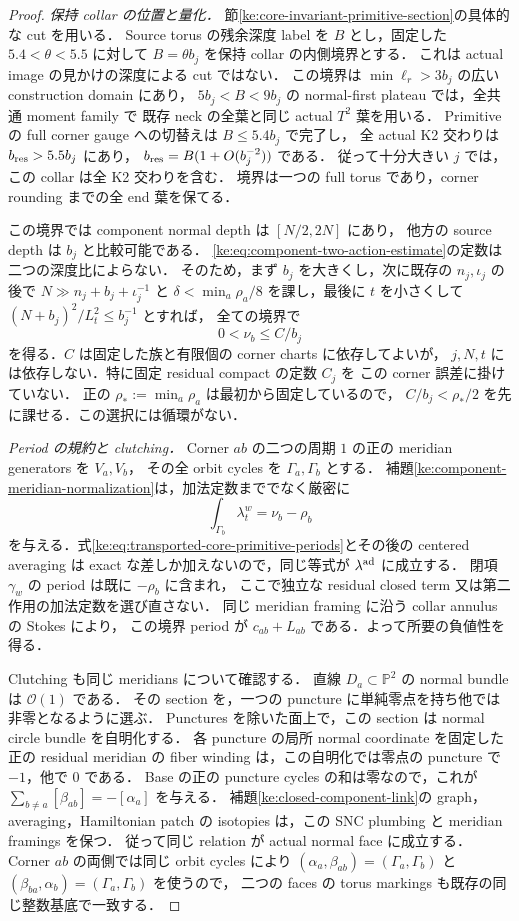 \begin{proof}
\emph{保持 collar の位置と量化．}
節\ref{ke:core-invariant-primitive-section}の具体的な cut を用いる．
Source torus の残余深度 label を $B$ とし，固定した
$5.4<\theta<5.5$ に対して $B=\theta b_j$ を保持 collar の内側境界とする．
これは actual image の見かけの深度による cut ではない．
この境界は $\min\ell_r>3b_j$ の広い construction domain にあり，
$5b_j<B<9b_j$ の normal-first plateau では，全共通 moment family で
既存 neck の全葉と同じ actual $T^2$ 葉を用いる．
Primitive の full corner gauge への切替えは $B\le5.4b_j$ で完了し，
全 actual K2 交わりは $b_{\rm res}>5.5b_j$ にあり，
$b_{\rm res}=B(1+O(b_j^{-2}))$ である．
従って十分大きい $j$ では，この collar は全 K2 交わりを含む．
境界は一つの full torus であり，corner rounding までの全 end 葉を保てる．

この境界では component normal depth は $[N/2,2N]$ にあり，
他方の source depth は $b_j$ と比較可能である．
\eqref{ke:eq:component-two-action-estimate}の定数は二つの深度比によらない．
そのため，まず $b_j$ を大きくし，次に既存の $n_j,\iota_j$ の後で
$N\gg n_j+b_j+\iota_j^{-1}$ と
$\delta<\min_a\rho_a/8$ を課し，最後に $t$ を小さくして
$(N+b_j)^2/L_t^2\le b_j^{-1}$ とすれば，
全ての境界で
\[
 0<\nu_b\le C/b_j
\]
を得る．$C$ は固定した族と有限個の corner charts に依存してよいが，
$j,N,t$ には依存しない．特に固定 residual compact の定数 $C_j$ を
この corner 誤差に掛けていない．
正の $\rho_*:=\min_a\rho_a$ は最初から固定しているので，
$C/b_j<\rho_*/2$ を先に課せる．この選択には循環がない．

\emph{Period の規約と clutching．}
Corner $ab$ の二つの周期 $1$ の正の meridian generators を $V_a,V_b$，
その全 orbit cycles を $\Gamma_a,\Gamma_b$ とする．
補題\ref{ke:component-meridian-normalization}は，加法定数まででなく厳密に
\[
 \int_{\Gamma_b}\lambda_t^w=\nu_b-\rho_b
\]
を与える．式\eqref{ke:eq:transported-core-primitive-periods}とその後の
centered averaging は exact な差しか加えないので，同じ等式が
$\lambda^{\rm ad}$ に成立する．
閉項 $\gamma_w$ の period は既に $-\rho_b$ に含まれ，
ここで独立な residual closed term 又は第二作用の加法定数を選び直さない．
同じ meridian framing に沿う collar annulus の Stokes により，
この境界 period が $c_{ab}+L_{ab}$ である．よって所要の負値性を得る．

Clutching も同じ meridians について確認する．
直線 $D_a\subset\mathbb P^2$ の normal bundle は $\mathcal O(1)$ である．
その section を，一つの puncture に単純零点を持ち他では非零となるように選ぶ．
Punctures を除いた面上で，この section は normal circle bundle を自明化する．
各 puncture の局所 normal coordinate を固定した正の residual meridian の
fiber winding は，この自明化では零点の puncture で $-1$，他で $0$ である．
Base の正の puncture cycles の和は零なので，これが
$\sum_{b\ne a}[\beta_{ab}]=-[\alpha_a]$ を与える．
補題\ref{ke:closed-component-link}の graph，averaging，Hamiltonian patch の
isotopies は，この SNC plumbing と meridian framings を保つ．
従って同じ relation が actual normal face に成立する．
Corner $ab$ の両側では同じ orbit cycles により
$(\alpha_a,\beta_{ab})=(\Gamma_a,\Gamma_b)$ と
$(\beta_{ba},\alpha_b)=(\Gamma_a,\Gamma_b)$ を使うので，
二つの faces の torus markings も既存の同じ整数基底で一致する．


\end{proof}
